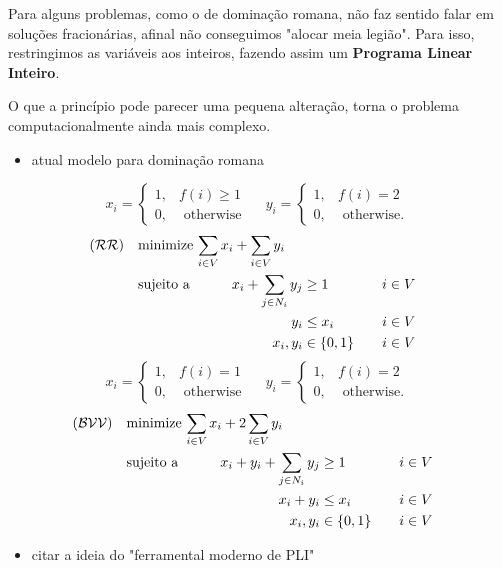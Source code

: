 \documentclass[11pt]{article}
\begin{document}
{Para alguns problemas, como o de dominação romana, não faz sentido falar em soluções fracionárias, afinal não conseguimos "alocar meia legião". 
Para isso, restringimos as variáveis aos inteiros, fazendo assim um \textbf{Programa Linear Inteiro}.

O que a princípio pode parecer uma pequena alteração, torna o problema computacionalmente ainda mais complexo.
\begin{itemize}
\item atual modelo para dominação romana
\end{itemize}
\begin{multicols}{2}
$$
x_i=\left\{\begin{array}{ll}
1, & f(i) \geqslant 1 \\
0, & \text { otherwise }
\end{array} \quad y_i= \begin{cases}1, & f(i)=2 \\
0, & \text { otherwise. }\end{cases}\right.
$$
\begin{alignat}{4}
(\mathcal{RR}) \quad & \omit\rlap{minimize  $\displaystyle \sum_{i \in V} x_i+\sum_{i \in V} y_i$} \\
& \mbox{sujeito a}&& \quad & x_i+\sum_{j \in N_i} y_j & \geq 1  & \quad & i \in V \\
&                 &&       & y_i                    & \leq x_i &        & i \in V \\
&                 &&       & x_i, y_i               & \in\{0,1\} &      & i \in V
\end{alignat}
$$
x_i=\left\{\begin{array}{ll}
1, & f(i)=1 \\
0, & \text { otherwise }
\end{array} \quad y_i= \begin{cases}1, & f(i)=2 \\
0, & \text { otherwise. }\end{cases}\right.
$$
\begin{alignat}{4}
(\mathcal{BVV}) \quad & \omit\rlap{minimize  $\displaystyle \sum_{i \in V} x_i+2\sum_{i \in V} y_i$} \\
& \mbox{sujeito a}&& \quad & x_i+y_i+\sum_{j \in N_i} y_j & \geq 1  & \quad & i \in V \\
&                 &&       & x_i + y_i                    & \leq x_i &        & i \in V \\
&                 &&       & x_i, y_i               & \in\{0,1\} &      & i \in V
\end{alignat}
\end{multicols}
\begin{itemize}
\item citar a ideia do "ferramental moderno de PLI"
\end{itemize}

}
\end{document}
